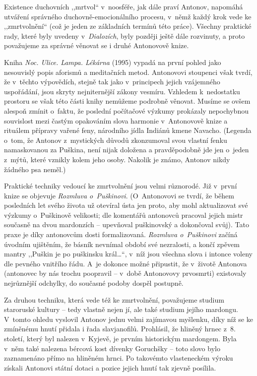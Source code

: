 Existence duchovních ,,mrtvol`` v~noosféře, jak dále praví Antonov, napomáhá utváření správného duchovně-emocionálního procesu, v~němž každý krok vede ke ,,zmrtvolnění`` (což je jeden ze základních termínů této práce). Všechny praktické rady, které byly uvedeny v~\textit{Dialozích}, byly později ještě dále rozvinuty, a proto považujeme za správné věnovat se i druhé Antonovově knize.

Kniha \textit{Noc. Ulice. Lampa. Lékárna} (1995) vypadá na první pohled jako nesouvislý popis aforismů a meditačních metod. Antonovovi stoupenci však tvrdí, že v~těchto výpovědích, stejně tak jako v~principech jejich vzájemného uspořádání, jsou skryty nejniternější zákony vesmíru. Vzhledem k~nedostatku prostoru se však této části knihy nemůžeme podrobně věnovat. Musíme se ovšem alespoň zmínit o~faktu, že poslední počítačové výzkumy prokázaly nepochybnou souvislost mezi častým opakováním slova harmonie v~Antonovově knize a rituálem přípravy vařené feny, národního jídla Indiánů kmene Navacho. (Legenda o~tom, že Antonov z mystických důvodů zkonzumoval svou vlastní fenku namaskovanou za Puškina, není nijak doložena a pravděpodobně jde jen o~jeden z~mýtů, které vznikly kolem jeho osoby. Nakolik je známo, Antonov nikdy žádného psa neměl.)

Praktické techniky vedoucí ke zmrtvolnění jsou velmi různorodé. Již v~první knize se objevuje \textit{Rozmluva o~Puškinovi}. (O~Antonovovi se tvrdí, že během posledních let svého života už otevíral ústa jen proto, aby mohl aktualizovat své výzkumy o~Puškinově velikosti; dle komentářů antonovců pracoval jejich mistr současně na dvou mardonzích -- upevňoval puškinovský a dokončoval svůj). Tato praxe je díky antonovcům dosti formalizovaná. \textit{Rozmluva o~Puškinovi} začíná úvodním ujištěním, že básník nevnímal období své nezralosti, a končí zpěvem mantry ,,Puškin je po puškinsku král\ldots``, v~níž jsou všechna slova i intonce voleny dle pevného vnitřího řádu. A~je dokonce možné připustit, že v~životě Antonova (antonovec by nás trochu poopravil -- v~době Antonovovy prvosmrti) existovaly nejrůznější odchylky, do současné podoby dospěl postupně.

Za druhou techniku, která vede též ke zmrtvolnění, považujeme studium staroruské kultury -- tedy vlastně nejen jí, ale také studium jejího mardongu. V~tomto ohledu vyslovil Antonov jednu velmi zajímavou myšlenku, díky níž se ke zmíněnému hnutí přidala i řada slavjanofilů. Prohlásil, že hliněný hrnec z~8. století, který byl nalezen v~Kyjevě, je prvním historickým mardongem. Byla v~něm také nalezena bércová kost dívenky Goruchšky -- toto slovo bylo zaznamenáno přímo na hliněném hrnci. Po takovémto vlasteneckém výroku získali Antonovi státní dotaci a pozice jejich hnutí tak zjevně posílila.

